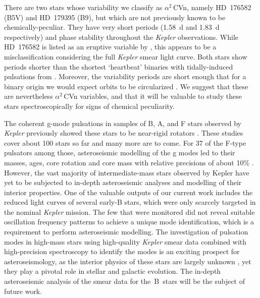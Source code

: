 \documentclass[modern]{aastex62}
\newcommand{\kepler}{\textit{Kepler}\xspace}
\begin{document}
There are two stars whose variability we classify as $\alpha^2$\,CVn, namely HD~176582 (B5V) and HD~179395 (B9), but which are not previously known to be chemically-peculiar. They have very short periods (1.58~d and 1.83~d respectively) and phase stability throughout the \kepler observations. While HD~176582 is listed as an eruptive variable by \citet{2016ApJ...829...23D}, this appears to be a misclassification considering the full \kepler smear light curve. Both stars show periods shorter than the shortest `heartbeat' binaries with tidally-induced pulsations from \citet{2012ApJ...753...86T}. Moreover, the variability periods are short enough that for a binary origin we would expect orbits to be circularized \citep{2000A&A...354..881D}. We suggest that these are nevertheless $\alpha^2$\,CVn variables, and that it will be valuable to study these stars spectroscopically for signs of chemical peculiarity.

The coherent g-mode pulsations in samples of B, A, and F stars observed by \kepler previously showed these stars to be near-rigid rotators \citep{kurtz2014,saio15,triana15,vanreeth15,vanreeth16,vanreeth18,murphy16,schmid16,moravveji16,ouazzani17,papics17,aerts17,szewczuk18,2018arXiv180907779A,2018A&A...618A..47C,2019MNRAS.482.1757L}. These studies cover about 100 stars so far and many more are to come. For 37 of the F-type pulsators among those, asteroseismic modelling of the g modes led to their masses, ages, core rotation and core mass with relative precisions of about 10\% \citep{2019MNRAS.tmp..495M}. However, the vast majority of intermediate-mass stars observed by Kepler have yet to be subjected to in-depth asteroseismic analyses and modelling of their interior properties. One of the valuable outputs of our current work includes the reduced light curves of several early-B stars, which were only scarcely targeted in the nominal \kepler mission. The few that were monitored did not reveal suitable oscillation frequency patterns to achieve a unique mode identification, which is a requirement to perform asteroseismic modelling. The investigation of pulsation modes in high-mass stars using high-quality \kepler smear data combined with high-precision spectroscopy to identify the modes \citep[Chapter 6]{aertsbook} is an exciting prospect for asteroseismology, as the interior physics of these stars are largely unknown \citep[e.g.][]{2019arXiv190502120B}, yet they play a pivotal role in stellar and galactic evolution. The in-depth asteroseismic analysis of the smear data for the~B~stars will be the subject of future work.
\end{document}
